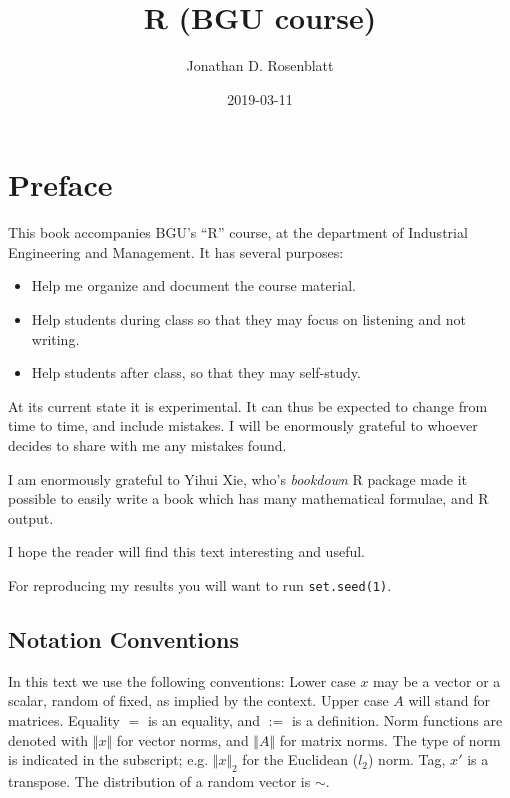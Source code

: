\documentclass[]{book}
\title{R (BGU course)}
\author{Jonathan D. Rosenblatt}
\date{2019-03-11}
\providecommand{\tightlist}{%
  \setlength{\itemsep}{0pt}\setlength{\parskip}{0pt}}
\theoremstyle{definition}
\theoremstyle{definition}
\theoremstyle{definition}
\theoremstyle{remark}
\begin{document}
\maketitle

{
\setcounter{tocdepth}{1}
\tableofcontents
}
\chapter{Preface}\label{preface}

This book accompanies BGU's ``R'' course, at the department of
Industrial Engineering and Management. It has several purposes:

\begin{itemize}
\tightlist
\item
  Help me organize and document the course material.
\item
  Help students during class so that they may focus on listening and not
  writing.
\item
  Help students after class, so that they may self-study.
\end{itemize}

At its current state it is experimental. It can thus be expected to
change from time to time, and include mistakes. I will be enormously
grateful to whoever decides to share with me any mistakes found.

I am enormously grateful to Yihui Xie, who's \emph{bookdown} R package
made it possible to easily write a book which has many mathematical
formulae, and R output.

I hope the reader will find this text interesting and useful.

For reproducing my results you will want to run \texttt{set.seed(1)}.

\section{Notation Conventions}\label{notation-conventions}

In this text we use the following conventions: Lower case \(x\) may be a
vector or a scalar, random of fixed, as implied by the context. Upper
case \(A\) will stand for matrices. Equality \(=\) is an equality, and
\(:=\) is a definition. Norm functions are denoted with
\(\Vert x \Vert\) for vector norms, and \(\Vert A \Vert\) for matrix
norms. The type of norm is indicated in the subscript; e.g.
\(\Vert x \Vert_2\) for the Euclidean (\(l_2\)) norm. Tag, \(x'\) is a
transpose. The distribution of a random vector is \(\sim\).
\end{document}
